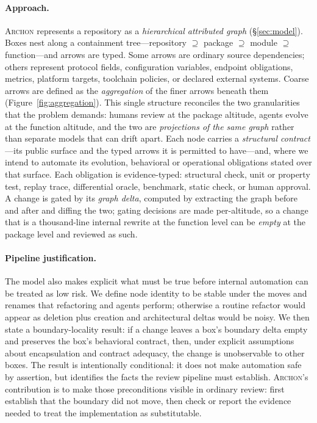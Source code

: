 \documentclass[sigconf,review,anonymous]{acmart}
\theoremstyle{plain}
\theoremstyle{definition}
\begin{document}
\paragraph{Approach.}
\textsc{Archon} represents a repository as a \emph{hierarchical attributed graph}
(\S\ref{sec:model}). Boxes nest along a containment tree---repository
$\supseteq$ package $\supseteq$ module $\supseteq$ function---and arrows are
typed. Some arrows are ordinary source dependencies; others represent protocol
fields, configuration variables, endpoint obligations, metrics, platform
targets, toolchain policies, or declared external systems. Coarse arrows are
defined as the \emph{aggregation} of the finer arrows beneath them
(Figure~\ref{fig:aggregation}). This single structure reconciles the two
granularities that the problem demands: humans review at the package altitude,
agents evolve at the function altitude, and the two are \emph{projections of the
same graph} rather than separate models that can drift apart. Each node carries
a \emph{structural contract}---its public surface and the typed arrows it is
permitted to have---and, where we intend to automate its evolution, behavioral
or operational obligations stated over that surface. Each obligation is
evidence-typed: structural check, unit or property test, replay trace,
differential oracle, benchmark, static check, or human approval. A change is
gated by its \emph{graph delta}, computed by extracting the graph before and
after and diffing the two; gating decisions are made per-altitude, so a change
that is a thousand-line internal rewrite at the function level can be
\emph{empty} at the package level and reviewed as such.

\paragraph{Pipeline justification.}
The model also makes explicit what must be true before internal automation can
be treated as low risk. We define node identity to be stable under the moves and
renames that refactoring and agents perform; otherwise a routine refactor would
appear as deletion plus creation and architectural deltas would be noisy. We
then state a boundary-locality result: if a change leaves a box's boundary delta
empty and preserves the box's behavioral contract, then, under explicit
assumptions about encapsulation and contract adequacy, the change is
unobservable to other boxes. The result is intentionally conditional: it does
not make automation safe by assertion, but identifies the facts the review
pipeline must establish. \textsc{Archon}'s contribution is to make those
preconditions visible in ordinary review: first establish that the boundary did
not move, then check or report the evidence needed to treat the implementation
as substitutable.
\end{document}
